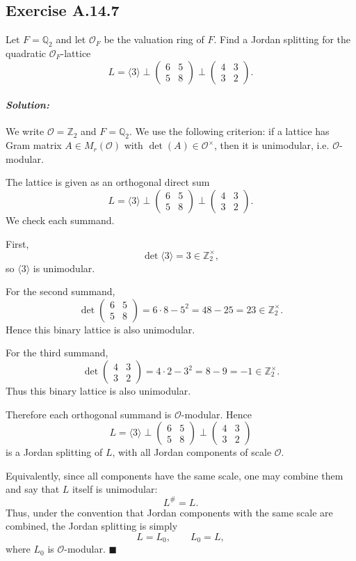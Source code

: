 \documentclass[12pt, a4paper]{article}
\newenvironment{solution}
  {\paragraph{\textit{Solution:}}\par\medskip}
  {\hfill$\blacksquare$\vspace{0.1cm}}
\begin{document}
\subsection*{Exercise A.14.7}
Let $F = \mathbb{Q}_2$ and let $\mathcal{O}_F$ be the valuation ring of $F$. Find a Jordan splitting for the quadratic $\mathcal{O}_F$-lattice
\[ L = \langle 3 \rangle \perp \begin{pmatrix} 6 & 5 \\ 5 & 8 \end{pmatrix} \perp \begin{pmatrix} 4 & 3 \\ 3 & 2 \end{pmatrix}. \]
\begin{solution}
We write \(\mathcal O=\mathbb Z_2\) and \(F=\mathbb Q_2\). We use the following
criterion: if a lattice has Gram matrix \(A\in M_r(\mathcal O)\) with
\(\det(A)\in\mathcal O^\times\), then it is unimodular, i.e. \(\mathcal O\)-modular.

The lattice is given as an orthogonal direct sum
\[
L=\langle 3\rangle
\perp
\begin{pmatrix}
6&5\\
5&8
\end{pmatrix}
\perp
\begin{pmatrix}
4&3\\
3&2
\end{pmatrix}.
\]
We check each summand.

First,
\[
\det\langle 3\rangle =3\in\mathbb Z_2^\times,
\]
so \(\langle 3\rangle\) is unimodular.

For the second summand,
\[
\det
\begin{pmatrix}
6&5\\
5&8
\end{pmatrix}
=
6\cdot 8-5^2
=
48-25
=
23\in\mathbb Z_2^\times.
\]
Hence this binary lattice is also unimodular.

For the third summand,
\[
\det
\begin{pmatrix}
4&3\\
3&2
\end{pmatrix}
=
4\cdot 2-3^2
=
8-9
=
-1\in\mathbb Z_2^\times.
\]
Thus this binary lattice is also unimodular.

Therefore each orthogonal summand is \(\mathcal O\)-modular. Hence
\[
L=\langle 3\rangle
\perp
\begin{pmatrix}
6&5\\
5&8
\end{pmatrix}
\perp
\begin{pmatrix}
4&3\\
3&2
\end{pmatrix}
\]
is a Jordan splitting of \(L\), with all Jordan components of scale
\(\mathcal O\).

Equivalently, since all components have the same scale, one may combine them
and say that \(L\) itself is unimodular:
\[
L^\#=L.
\]
Thus, under the convention that Jordan components with the same scale are
combined, the Jordan splitting is simply
\[
L=L_0,
\qquad L_0=L,
\]
where \(L_0\) is \(\mathcal O\)-modular.
\end{solution}
\end{document}

